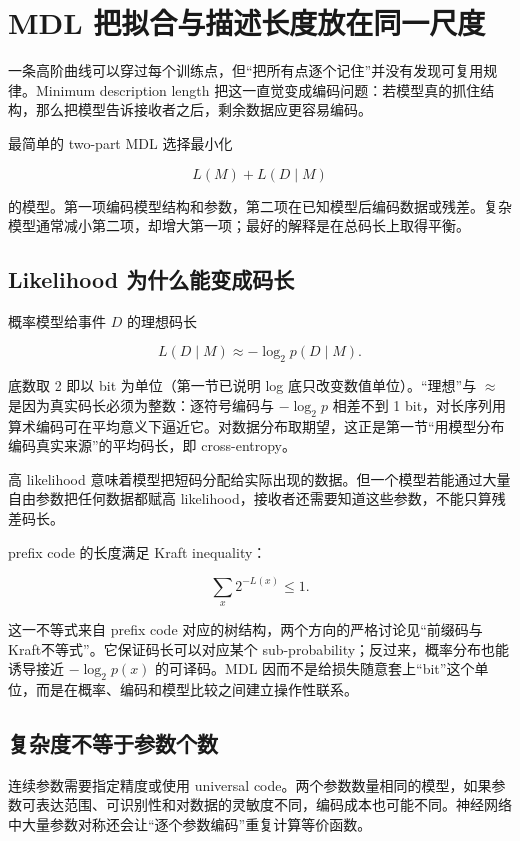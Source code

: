 \section{MDL 把拟合与描述长度放在同一尺度}

一条高阶曲线可以穿过每个训练点，但``把所有点逐个记住''并没有发现可复用规律。Minimum description length 把这一直觉变成编码问题：若模型真的抓住结构，那么把模型告诉接收者之后，剩余数据应更容易编码。

最简单的 two-part MDL 选择最小化

\[
L(M)+L(D\mid M)
\]

的模型。第一项编码模型结构和参数，第二项在已知模型后编码数据或残差。复杂模型通常减小第二项，却增大第一项；最好的解释是在总码长上取得平衡。

\subsection{Likelihood 为什么能变成码长}

概率模型给事件 \(D\) 的理想码长

\[
L(D\mid M)\approx-\log_2p(D\mid M).
\]

底数取 2 即以 bit 为单位（第一节已说明 log 底只改变数值单位）。``理想''与 \(\approx\) 是因为真实码长必须为整数：逐符号编码与 \(-\log_2p\) 相差不到 1 bit，对长序列用算术编码可在平均意义下逼近它。对数据分布取期望，这正是第一节``用模型分布编码真实来源''的平均码长，即 cross-entropy。

高 likelihood 意味着模型把短码分配给实际出现的数据。但一个模型若能通过大量自由参数把任何数据都赋高 likelihood，接收者还需要知道这些参数，不能只算残差码长。

prefix code 的长度满足 Kraft inequality：

\[
\sum_x2^{-L(x)}\le1.
\]

这一不等式来自 prefix code 对应的树结构，两个方向的严格讨论见``前缀码与Kraft不等式''。它保证码长可以对应某个 sub-probability；反过来，概率分布也能诱导接近 \(-\log_2p(x)\) 的可译码。MDL 因而不是给损失随意套上``bit''这个单位，而是在概率、编码和模型比较之间建立操作性联系。

\subsection{复杂度不等于参数个数}

连续参数需要指定精度或使用 universal code。两个参数数量相同的模型，如果参数可表达范围、可识别性和对数据的灵敏度不同，编码成本也可能不同。神经网络中大量参数对称还会让``逐个参数编码''重复计算等价函数。

